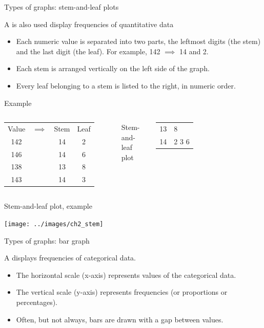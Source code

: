 \documentclass[xcolor=table, handout]{beamer}
\begin{document}
\begin{frame}{Types of graphs: stem-and-leaf plots}
\begin{block}{}
A  is also used display frequencies of quantitative data
\begin{itemize}
\item Each numeric value is separated into two parts, the leftmost digits (the stem) and the last digit (the leaf). For example, 142 $\implies$ 14 and 2.
\item Each stem is arranged vertically on the left side of the graph.
\item Every leaf belonging to a stem is listed to the right, in numeric order.
\end{itemize}
\end{block}
\pause

\begin{exampleblock}{Example}
\begin{columns}
\centering
\begin{tabular}{c c c | c}
Value & $\implies$ & Stem & Leaf\\
142 && 14 & 2\\
146 && 14 & 6\\
138 && 13 & 8\\
143 && 14 & 3
\end{tabular}
\pause
{}
\centering
Stem-and-leaf plot\\

\begin{tabular}{c|l}
13 & 8\\
14 & 2 3 6
\end{tabular}
\end{columns}
\end{exampleblock}
\end{frame}

\begin{frame}{Stem-and-leaf plot, example}
\bigskip
{\centering
\texttt{[image: ../images/ch2\_stem]}
\par}

\end{frame}

\begin{frame}{Types of graphs: bar graph}
\begin{block}{}
A  displays frequencies of categorical data.
\begin{itemize}
\item The horizontal scale (x-axis) represents values of the categorical data.
\item The vertical scale (y-axis) represents frequencies (or proportions or percentages).
\item Often, but not always, bars are drawn with a gap between values.
\end{itemize}
\end{block}
\end{frame}
\end{document}

